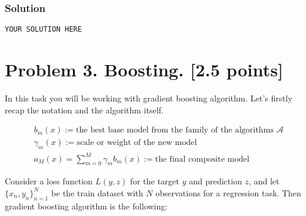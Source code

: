 \documentclass{article}
\begin{document}
\subsubsection*{Solution}
\texttt{YOUR SOLUTION HERE}


\newpage
\section*{Problem 3. Boosting. [2.5 points]}

In this task you will be working with gradient boosting algorithm. Let's firstly recap the notation and the algorithm itself.

\begin{align}
    & b_m(x) := \text{the best base model from the family of the algorithms $\mathcal{A}$} \\
    & \gamma_m(x) := \text{scale or weight of the new model} \\
    & a_M(x) = \sum_{m=0}^M \gamma_m b_m(x) := \text{the final composite model}
\end{align}


Consider a loss function $L(y, z)$ for the target $y$ and prediction $z$, and let
$\{x_n, y_n\}_{n=1}^N$ be the train dataset with $N$ observations for a regression task. Then gradient boosting algorithm is the following:
\end{document}
